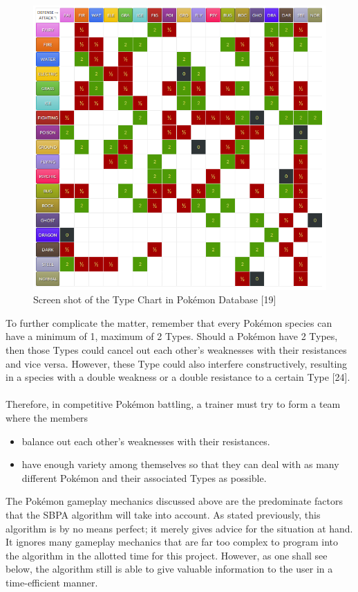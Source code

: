 \documentclass{article}
\begin{document}
\begin{figure}[H]
	\includegraphics[width=\textwidth]{TypeChart.png}
	\centering
	\caption{Screen shot of the Type Chart in Pok\'emon Database [19]}
\end{figure}
To further complicate the matter, remember that every Pok\'emon species can have a minimum of 1, maximum of 2 Types. Should a Pok\'emon have 2 Types, then those Types could cancel out each other's weaknesses with their resistances and vice versa. However, these Type could also interfere constructively, resulting in a species with a double weakness or a double resistance to a certain Type [24].\\\\
Therefore, in competitive Pok\'emon battling, a trainer must try to form a team where the members
\begin{itemize}
	\item balance out each other's weaknesses with their resistances.
	\item have enough variety among themselves so that they can deal with as many different Pok\'emon and their associated Types as possible.
\end{itemize}
The Pok\'emon gameplay mechanics discussed above are the predominate factors that the SBPA algorithm will take into account. As stated previously, this algorithm is by no means perfect; it merely gives advice for the situation at hand. It ignores many gameplay mechanics that are far too complex to program into the algorithm in the allotted time for this project. However, as one shall see below, the algorithm still is able to give valuable information to the user in a time-efficient manner.
\end{document}
